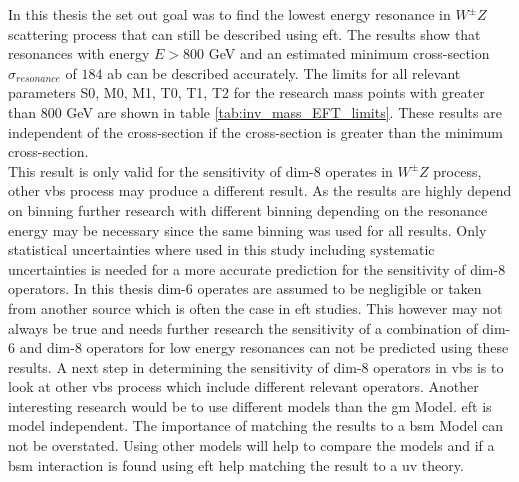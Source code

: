 \documentclass[../Bachelorarbeit.tex]{subfiles}
\begin{document}
\label{sec:summery}
In this thesis the set out goal was to find the lowest energy resonance in $W^{\pm}Z$ scattering process that can still be described using \acrshort{eft}.
The results show that resonances with energy $E>800$ GeV and an estimated minimum cross-section $\sigma_{resonance}$ of $184$ ab can be described accurately.
The limits for all relevant parameters S0, M0, M1, T0, T1, T2 for the research mass points with greater than 800 GeV are shown in table \ref{tab:inv_mass_EFT_limits}.
These results are independent of the cross-section if the cross-section is greater than the minimum cross-section.\\
This result is only valid for the sensitivity of dim-8 operates in $W^{\pm}Z$ process, other \acrshort{vbs} process may produce a different result.
As the results are highly depend on binning further research with different binning depending on the resonance energy may be necessary since the same binning was used for all results.
Only statistical uncertainties where used in this study including systematic uncertainties is needed for a more accurate prediction for the sensitivity of dim-8 operators.
In this thesis dim-6 operates are assumed to be negligible or taken from another source which is often the case in \acrshort{eft} studies.
This however may not always be true and needs further research the sensitivity of a combination of dim-6 and dim-8 operators for low energy resonances can not be predicted using these results.
A next step in determining the sensitivity of dim-8 operators in \acrshort{vbs} is to look at other \acrshort{vbs} process which include different relevant operators.
Another interesting research would be to use different models than the \acrshort{gm} Model. \acrshort{eft} is model independent. The importance of matching the results to a \acrshort{bsm} Model can not be overstated.
Using other models will help to compare the models and if a \acrshort{bsm} interaction is found using \acrshort{eft} help matching the result to a \acrshort{uv} theory.
\end{document}
